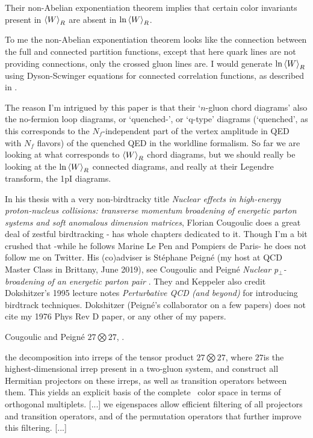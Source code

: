 \begin{description}
Their non-Abelian exponentiation theorem implies that certain color
invariants present in ${\left< {W} \right>}_R$ are absent in $\ln {\left< {W} \right>}_R$.

To me the non-Abelian exponentiation theorem looks like the connection
between the full and connected partition functions, except that here
quark lines are not providing connections, only the crossed gluon lines
are. I would generate $\ln {\left< {W} \right>}_R$ using Dyson-Scwinger equations for
connected correlation functions, as described in .

The reason I'm intrigued by this paper is that their `$n$-gluon chord
diagrams' also the no-fermion loop diagrams, or `quenched-', or `q-type'
diagrams (`quenched', as this corresponds to the $N_f$-independent part
of the vertex amplitude in QED with $N_f$ flavors) of the quenched QED in
the worldline formalism. So far we are looking at what corresponds to
${\left< {W} \right>}_R$ chord diagrams, but we should really be looking at the $\ln
{\left< {W} \right>}_R$ connected diagrams, and really at their Legendre transform,
the 1pI diagrams.

\item[2019-02-12 Predrag]
In his thesis with  a very non-birdtracky title {\em Nuclear
effects in high-energy proton-nucleus collisions: transverse momentum broadening
of energetic parton systems and soft anomalous dimension matrices},
 {Florian Cougoulic} does a great
deal of zestful birdtracking - has whole chapters dedicated to it.
Though I'm a bit crushed that -while he follows Marine Le Pen and
Pompiers de Paris- he does not follow me on
 {Twitter}. His (co)adviser is
{St{\'e}phane Peign{\'e}} (my host at QCD Master
Class in Brittany, June 2019), see
Cougoulic and Peign{\'{e}}
{\em Nuclear p$_\bot$-broadening of an energetic parton pair}
.
They and Keppeler also credit Dokshitzer's 1995 lecture notes
{\it Perturbative QCD (and beyond)} for introducing birdtrack techniques.
Dokshitzer (Peign{\'e}'s collaborator on a few papers) does not cite my 1976
Phys Rev D paper, or any other of my papers.

\item[2025-08-13 Predrag]
Cougoulic and Peign{\'{e}} %
$27\bigotimes27$,
.

the decomposition into irreps of the
tensor product $27\bigotimes27$, where $27$is the highest-dimensional irrep present in a
two-gluon system, and construct all Hermitian projectors on
these irreps, as well as transition operators between them. This yields
an explicit basis of the complete \ color space
in terms of orthogonal multiplets. [...] we
eigenspaces allow efficient filtering of all projectors and transition
operators, and of the permutation operators that further improve this
filtering. [...]


\end{description}
